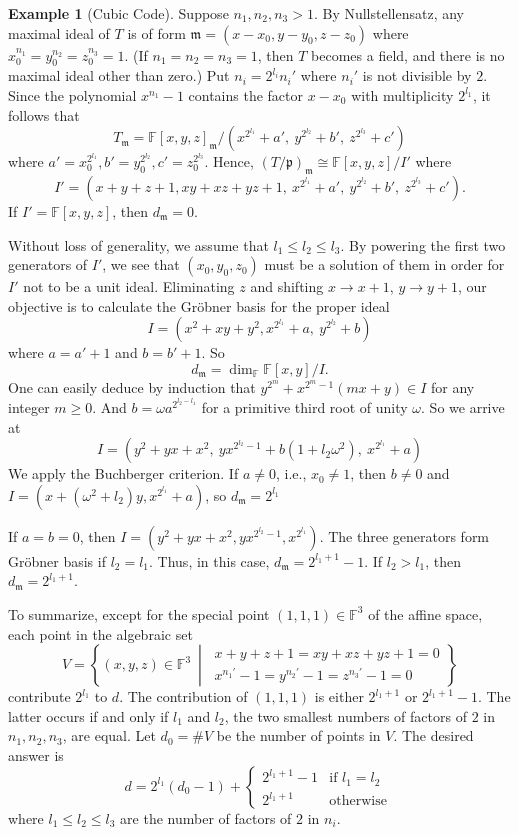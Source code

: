\documentclass[letterpaper,12pt]{amsart}
\theoremstyle{definition} \newtheorem{defn}{Definition}
\theoremstyle{definition} \newtheorem{rem}{Remark}
\theoremstyle{definition} \newtheorem{example}{Example}
\newcommand{\FF}{\mathbb{F}}
\newcommand{\mm}{\mathfrak{m}}
\newcommand{\pp}{\mathfrak{p}}
\begin{document}
\begin{example}[Cubic Code]
Suppose $n_1,n_2,n_3 > 1$.
By Nullstellensatz, any maximal ideal of $T$ is of form
$\mm=(x-x_0,y-y_0,z-z_0)$ where $x_0^{n_1}=y_0^{n_2}=z_0^{n_3}=1$.
(If $n_1 = n_2 = n_3 = 1$, then $T$ becomes a field, and there is no maximal ideal other than zero.)
Put $n_i = 2^{l_i}n_i'$ where $n_i'$ is not divisible by $2$.
Since the polynomial $x^{n_1} -1$ contains the factor $x-x_0$ with multiplicity $2^{l_1}$,
it follows that
\[
 T_\mm = \FF [x,y,z]_\mm / ( x^{2^{l_1}}+a',~ y^{2^{l_2}}+b',~ z^{2^{l_3}}+c')
\]
where $a' = x_0^{2^{l_1}}, b' = y_0^{2^{l_2}}, c' = z_0^{2^{l_3}}$.
Hence, $(T/\pp)_\mm \cong \FF[x,y,z] / I'$ where
\[
 I' = (x+y+z+1, xy+xz+yz+1 ,~ x^{2^{l_1}}+a',~ y^{2^{l_2}}+b',~ z^{2^{l_3}}+c').
\]
If $I' = \FF[x,y,z]$, then $d_\mm = 0$.


Without loss of generality, we assume that $l_1 \le l_2 \le l_3$.
By powering the first two generators of $I'$,
we see that $(x_0,y_0,z_0)$ must be a solution of them in order for $I'$ not to be a unit ideal.
Eliminating $z$ and shifting $x \to x+1$, $y \to y+1$,
our objective is to calculate the Gr\"obner basis for the proper ideal
\[
 I = (x^2+xy+y^2, x^{2^{l_1}}+a,~ y^{2^{l_2}}+b )
\]
where $a=a'+1$ and $b = b'+1$. So
\[
 d_\mm = \dim_{\FF} \FF[x,y]/I.
\]
One can easily deduce by induction that $y^{2^m} + x^{2^m-1}(m x +y) \in I$ for any integer $m \ge 0$.
And $b = \omega a^{2^{l_2 - l_1}}$ for a primitive third root of unity $\omega$.
So we arrive at
\[
 I = ( y^2 + yx + x^2,~ yx^{2^{l_2} -1 } + b ( 1 + l_2 \omega^2 ),~ x^{2^{l_1}} + a )
\]
We apply the Buchberger criterion.
If $a \neq 0$, i.e., $x_0 \neq 1$,
then $b \neq 0$ and $I = (x+(\omega^2 + l_2)y, x^{2^{l_1}} + a)$,
so $d_\mm = 2^{l_1}$

If $a=b=0$,
then $I = (y^2 + yx + x^2, yx^{2^{l_2}-1}, x^{2^{l_1}} )$.
The three generators form Gr\"obner basis if $l_2 = l_1$.
Thus, in this case, $d_\mm = 2^{l_1+1}-1$.
If $ l_2 > l_1$, then $d_\mm = 2^{l_1+1}$.

To summarize, except for the special point $(1,1,1)\in \FF^3$ of the affine space,
each point in the algebraic set
\[
 V = \left\{ (x,y,z) \in \FF^3 ~\middle|~
\begin{matrix}
x+y+z+1 = xy+xz+yz+1 = 0 \\  
x^{n_1'}-1 = y^{n_2'}-1 = z^{n_3'}-1 = 0
\end{matrix}
\right\}
\]
contribute $2^{l_1}$ to $d$. The contribution of $(1,1,1)$ is either $2^{l_1 +1}$ or $2^{l_1 +1}-1$.
The latter occurs if and only if $l_1$ and $l_2$,
the two smallest numbers of factors of $2$ in $n_1,n_2,n_3$,
are equal. Let $d_0 = \#V$ be the number of points in $V$.
The desired answer is
\[
 d = 2^{l_1} (d_0 -1) + 
\begin{cases} 
2^{l_1 +1} -1 & \text{if $l_1 = l_2$ } \\
2^{l_1 +1}    & \text{otherwise}
\end{cases}
\]
where $l_1 \le l_2 \le l_3$ are the number of factors of $2$ in $n_i$.



\end{example}
\end{document}
